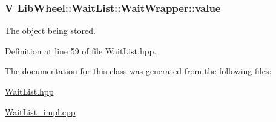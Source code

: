 \hypertarget{classLibWheel_1_1WaitList_1_1WaitWrapper_a343d0e2af0e140f50a42fc3019483706}{
\subsubsection[{value}]{\setlength{\rightskip}{0pt plus 5cm}\-V {\bf \-Lib\-Wheel\-::\-Wait\-List\-::\-Wait\-Wrapper\-::value}}}
\label{classLibWheel_1_1WaitList_1_1WaitWrapper_a343d0e2af0e140f50a42fc3019483706}


\-The object being stored. 



\-Definition at line 59 of file \-Wait\-List.\-hpp.



\-The documentation for this class was generated from the following files\-:\begin{DoxyCompactItemize}
\item 
\hyperlink{WaitList_8hpp}{\-Wait\-List.\-hpp}\item 
\hyperlink{WaitList__impl_8cpp}{\-Wait\-List\-\_\-impl.\-cpp}\end{DoxyCompactItemize}

